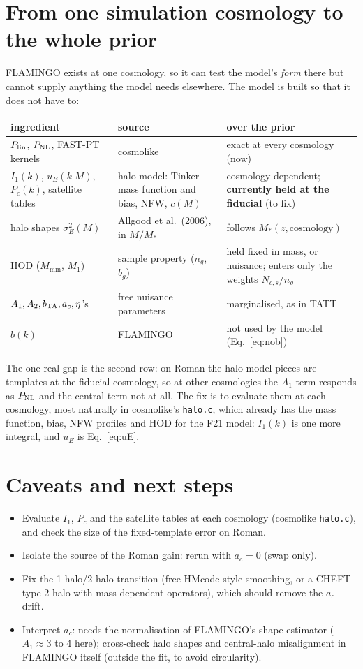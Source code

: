 \documentclass[11pt]{article}
\newcommand{\PNL}{P_{\rm NL}}
\newcommand{\Plin}{P_{\rm lin}}
\newcommand{\bTA}{b_{\rm TA}}
\begin{document}
\section{From one simulation cosmology to the whole prior}\label{sec:prior}
FLAMINGO exists at one cosmology, so it can test the model's \emph{form} there but
cannot supply anything the model needs elsewhere. The model is built so that it
does not have to:
\begin{center}\small
\begin{tabular}{p{4.2cm} p{5.4cm} p{6.0cm}}\toprule
ingredient & source & over the prior\\ \midrule
$\Plin$, $\PNL$, FAST-PT kernels & cosmolike & exact at every cosmology (now)\\
$I_1(k)$, $u_E(k|M)$, $P_c(k)$, satellite tables & halo model: Tinker mass function and bias, NFW, $c(M)$ & cosmology dependent; \textbf{currently held at the fiducial} (to fix)\\
halo shapes $\sigma_E^2(M)$ & Allgood et al.\ (2006), in $M/M_*$ & follows $M_*(z, \text{cosmology})$\\
HOD ($M_{\min}$, $M_1$) & sample property ($\bar n_g$, $b_g$) & held fixed in mass, or nuisance; enters only the weights $N_{c,s}/\bar n_g$\\
$A_1, A_2, \bTA, a_c, \eta$'s & free nuisance parameters & marginalised, as in TATT\\
$b(k)$ & FLAMINGO & not used by the model (Eq.~\ref{eq:nob})\\
\bottomrule\end{tabular}
\end{center}
The one real gap is the second row: on Roman the halo-model pieces are templates
at the fiducial cosmology, so at other cosmologies the $A_1$ term responds as
$\PNL$ and the central term not at all. The fix is to evaluate them at each
cosmology, most naturally in cosmolike's \texttt{halo.c}, which already has the
mass function, bias, NFW profiles and HOD for the F21 model: $I_1(k)$ is one more
integral, and $u_E$ is Eq.~\eqref{eq:uE}.

\section{Caveats and next steps}
\begin{itemize}[itemsep=2pt]
\item Evaluate $I_1$, $P_c$ and the satellite tables at each cosmology (cosmolike
  \texttt{halo.c}), and check the size of the fixed-template error on Roman.
\item Isolate the source of the Roman gain: rerun with $a_c = 0$ (swap only).
\item Fix the 1-halo/2-halo transition (free HMcode-style smoothing, or a
  CHEFT-type 2-halo with mass-dependent operators), which should remove the $a_c$
  drift.
\item Interpret $a_c$: needs the normalisation of FLAMINGO's shape estimator
  ($A_1 \approx 3$ to 4 here); cross-check halo shapes and central-halo misalignment
  in FLAMINGO itself (outside the fit, to avoid circularity).
\end{itemize}
\end{document}
